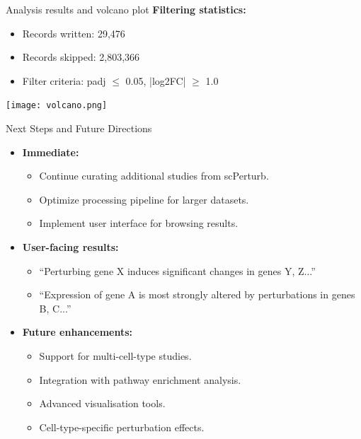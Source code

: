 \documentclass[handout]{beamer}
\begin{document}
\begin{frame}{Analysis results and volcano plot}
    \textbf{Filtering statistics:}
    \begin{itemize}
        \item Records written: 29,476
        \item Records skipped: 2,803,366
        \item Filter criteria: padj $\leq$ 0.05, |log2FC| $\geq$ 1.0
    \end{itemize}

    \vspace{1em}
    \begin{center}
        \texttt{[image: volcano.png]}
    \end{center}
\end{frame}

\begin{frame}{Next Steps and Future Directions}
    \begin{itemize}
        \item \textbf{Immediate:}
        \begin{itemize}
            \item Continue curating additional studies from scPerturb.
            \item Optimize processing pipeline for larger datasets.
            \item Implement user interface for browsing results.
        \end{itemize}
        \item \textbf{User-facing results:}
        \begin{itemize}
            \item ``Perturbing gene X induces significant changes in genes Y, Z...''
            \item ``Expression of gene A is most strongly altered by perturbations in genes B, C...''
        \end{itemize}
        \item \textbf{Future enhancements:}
        \begin{itemize}
            \item Support for multi-cell-type studies.
            \item Integration with pathway enrichment analysis.
            \item Advanced visualisation tools.
            \item Cell-type-specific perturbation effects.
        \end{itemize}
    \end{itemize}
\end{frame}
\end{document}
